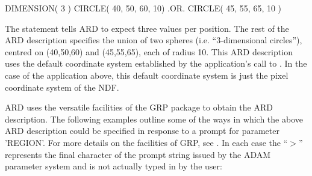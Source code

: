 \documentclass[11pt]{starlink}
\begin{document}
\small
\begin{terminalv}
      DIMENSION( 3 )
      CIRCLE( 40, 50, 60, 10) .OR. CIRCLE( 45, 55, 65, 10 )
\end{terminalv}
\normalsize

The  statement tells ARD to expect three values per position. The rest
of the ARD description specifies the union of two spheres (i.e. ``3-dimensional
circles''), centred on (40,50,60) and (45,55,65), each of radius 10. This ARD
description uses the default coordinate system established by the application's
call to . In the case of the application above, this default
coordinate system is just the pixel coordinate system of the NDF.

ARD uses the versatile facilities of the GRP package to obtain the ARD
description. The following examples outline some of the ways in which the above
ARD description could be specified in response to a prompt for parameter
'REGION'. For more details on the facilities of GRP, see . In each case
the ``$>$'' represents the final character of the prompt string issued by the
ADAM parameter system and is not actually typed in by the user:
\end{document}
